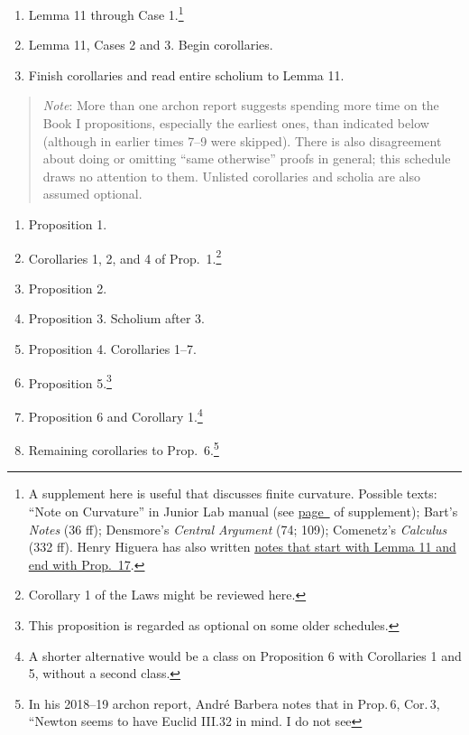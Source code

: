 \documentclass[10pt]{article}
\begin{document}
{\begin{enumerate}[resume*]
		and 4.\footnote{Corollary 4 is invoked in
			I.6 and relevant to III.4. This is
			also sometimes assigned with a
			review of Prop.~II of ``On naturally
			accelerated motion'' from \emph{Two
				New Sciences} (NE 208 ff).}
	\item Lemma 11 through Case 1.\footnote{A supplement
			here is useful that discusses finite
			curvature. Possible texts: ``Note on
			Curvature'' in Junior Lab manual
			(see
			\hyperref[supple.74]{page~\pageref{supple.74}}
			of supplement); Bart's \emph{Notes}
			(36 ff); Densmore's \emph{Central
				Argument} (74; 109);
			Comenetz's \emph{Calculus} (332 ff).
			Henry Higuera has also written
			\href{https://drive.google.com/file/d/1YZfQPV6poJMzZvZ3DyGfJopGkzy7oe7K/view?usp=sharing}{notes
			that start with Lemma 11 and
			end with Prop.~17}.}
	\item Lemma 11,
		Cases 2 and 3.  Begin corollaries.  \item
		Finish corollaries and read entire scholium
		to Lemma 11.  \end{enumerate}
		\begin{quote}
	\small{\emph{Note}: More than one archon report
		suggests spending more time on the Book I
		propositions, especially the earliest ones,
		than indicated below (although in earlier
		times 7--9 were skipped).  There is also
		disagreement about doing or omitting ``same
		otherwise'' proofs in general; this schedule
		draws no attention to them. Unlisted
		corollaries and scholia are also assumed
		optional.} \end{quote}
\begin{enumerate}[resume*] \item Proposition 1.  \item
		Corollaries 1, 2, and 4 of
		Prop.~1.\footnote{Corollary 1 of the Laws
			might be reviewed here.} \item
		Proposition 2.  \item Proposition 3.
		Scholium after 3.  \item Proposition 4.
		Corollaries 1--7.  \item Proposition
		5.\footnote{This proposition is regarded as
			optional on some older schedules.}
	\item Proposition 6 and Corollary 1.\footnote{A
			shorter alternative would be
			a class on Proposition 6 with Corollaries 1 and
			5, without a second class.}  \item
		Remaining corollaries to Prop.~6.\footnote{In his 2018--19 archon report, Andr\'e Barbera notes that in Prop.\,6, Cor.\,3, ``Newton seems to have Euclid III.32 in mind. I do not see
}
\end{enumerate}}
\end{document}
